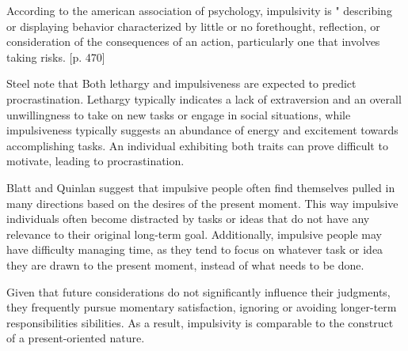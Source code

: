 According to the american association of psychology, impulsivity is "
describing or displaying behavior characterized by little or no forethought,
reflection, or consideration of the consequences of an action,
particularly one that involves taking risks. [p. 470]\cite{APA2022}

Steel note that Both lethargy and impulsiveness are expected to predict procrastination.
Lethargy typically indicates a lack of extraversion and an overall unwillingness to take on
new tasks or engage in
social situations, while impulsiveness typically suggests an abundance of energy and excitement
towards accomplishing tasks. An individual exhibiting both traits can prove difficult to motivate,
leading to procrastination.\cite{Steel2007}

Blatt and Quinlan suggest that impulsive people often find themselves pulled in many
directions based on the desires of the present moment. This way impulsive individuals often
become distracted by tasks or ideas that do not have any relevance to their original long-term goal.
Additionally, impulsive people may have difficulty managing time,
as they tend to focus on whatever task or idea they are drawn to the present moment,
instead of what needs to be done.\cite{Blatt1967Apr}


Given that future considerations do not significantly influence their judgments,
they frequently pursue
momentary satisfaction, ignoring or avoiding longer-term responsibilities
sibilities.
As a result, impulsivity is comparable to the construct
of a present-oriented nature.\cite{Steel2007}